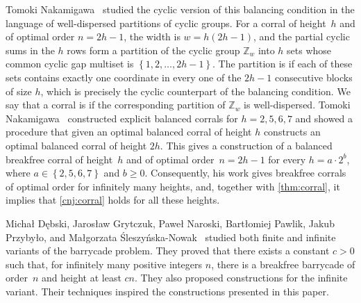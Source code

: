 \documentclass[runningheads,envcountsame]{llncs}
\newcommand{\set}[1]{\left\{ #1 \right\}}
\let\ge\geqslant
\begin{document}
Tomoki Nakamigawa~\cite{Nakamigawa2015} studied the cyclic version of this balancing condition in the language of well-dispersed partitions of cyclic groups.
For a corral of height~$h$ and of optimal order $n=2h-1$, the width is $w=h(2h-1)$, and the partial cyclic sums in the $h$ rows form a partition of the cyclic group $\mathbb{Z}_w$ into $h$ sets whose common cyclic gap multiset is $\set{1,2,\ldots,2h-1}$.
The partition is  if each of these sets contains exactly one coordinate in every one of the $2h-1$ consecutive blocks of size $h$, which is precisely the cyclic counterpart of the balancing condition.
We say that a corral is  if the corresponding partition of $\mathbb{Z}_w$ is well-dispersed.
Tomoki Nakamigawa~\cite[Theorem~5]{Nakamigawa2015} constructed explicit balanced corrals for $h=2,5,6,7$ and showed a procedure that given an optimal balanced corral of height $h$ constructs an optimal balanced corral of height $2h$.
This gives a construction of a balanced breakfree corral of height~$h$ and of optimal order~$n=2h-1$ for every $h=a\cdot 2^b$, where $a\in\set{2,5,6,7}$ and $b\ge0$.
Consequently, his work gives breakfree corrals of optimal order for infinitely many heights, and, together with \cref{thm:corral}, it implies that \cref{cnj:corral} holds for all these heights.


Michał Dębski, Jarosław Grytczuk, Paweł Naroski, Bartłomiej Pawlik, Jakub Przybyło, and Małgorzata Śleszyńska-Nowak~\cite{DebskiGNPPS2026} studied both finite and infinite variants of the barrycade problem.
They proved that there exists a constant $c>0$ such that, for infinitely many positive integers $n$, there is a breakfree barrycade of order~$n$ and height at least $cn$.
They also proposed constructions for the infinite variant.
Their techniques inspired the constructions presented in this paper.
\end{document}
